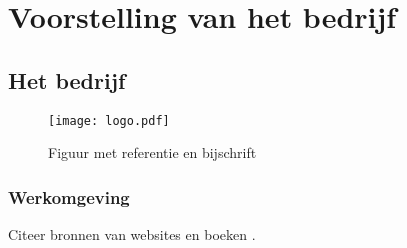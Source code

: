 
\section{Voorstelling van het bedrijf} %
\label{sec:Voorstelling}

\subsection{Het bedrijf} %
\label{sub:bedrijf}

\lipsum[1]

\begin{figure}[H]
  \label{figure:golden-circle}
  \centering
  \texttt{[image: logo.pdf]}
  \caption{Figuur met referentie en bijschrift \cite{voorbeeld-ref}}
\end{figure}

\subsubsection{Werkomgeving}

Citeer bronnen van websites \cite{voorbeeld-ref} en boeken \cite{boek-ref}.

\lipsum[1]

